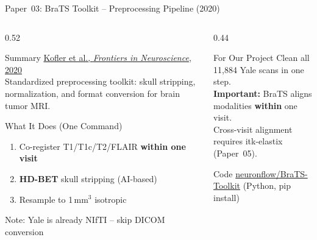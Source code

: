 \documentclass[aspectratio=169,xcolor=dvipsnames]{beamer}
\begin{document}
\begin{frame}{Paper~03: BraTS Toolkit -- Preprocessing Pipeline (2020)}
    \begin{columns}
        \begin{column}{0.52\textwidth}
            \begin{block}{Summary}
                \small
                \href{https://doi.org/10.3389/fnins.2020.00125}{Kofler et al., \textit{Frontiers in Neuroscience}, 2020}\\[0.3em]
                Standardized preprocessing toolkit: skull stripping, normalization, and format conversion for brain tumor MRI.
            \end{block}

            \vspace{0.2em}

            \begin{block}{What It Does (One Command)}
                \small
                \begin{enumerate}
                    \item Co-register T1/T1c/T2/FLAIR \textbf{within one visit}
                    \item \textbf{HD-BET} skull stripping (AI-based)
                    \item Resample to 1\,mm$^3$ isotropic
                \end{enumerate}
                \vspace{0.2em}
                {\scriptsize Note: Yale is already NIfTI -- skip DICOM conversion}
            \end{block}
        \end{column}

        \begin{column}{0.44\textwidth}
            \begin{alertblock}{For Our Project}
                \small
                Clean all 11,884 Yale scans in one step.\\[0.3em]
                \textbf{Important:} BraTS aligns modalities \textbf{within} one visit.\\
                Cross-visit alignment requires itk-elastix (Paper~05).
            \end{alertblock}

            \vspace{0.2em}

            \begin{exampleblock}{\scriptsize {} Code}
                \scriptsize \href{https://github.com/neuronflow/BraTS-Toolkit}{neuronflow/BraTS-Toolkit} (Python, pip install)
            \end{exampleblock}
        \end{column}
    \end{columns}
\end{frame}
\end{document}
